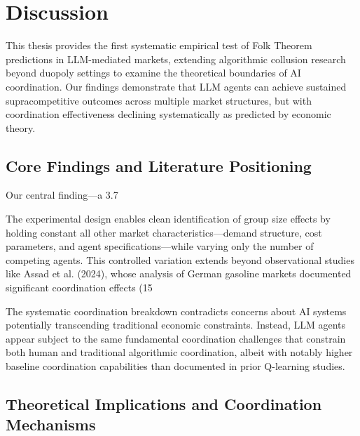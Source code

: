 \section{Discussion}\label{sec:dis}

This thesis provides the first systematic empirical test of Folk Theorem predictions in LLM-mediated markets, extending algorithmic collusion research beyond duopoly settings to examine the theoretical boundaries of AI coordination. Our findings demonstrate that LLM agents can achieve sustained supracompetitive outcomes across multiple market structures, but with coordination effectiveness declining systematically as predicted by economic theory.

\subsection{Core Findings and Literature Positioning}

Our central finding—a 3.7%

The experimental design enables clean identification of group size effects by holding constant all other market characteristics—demand structure, cost parameters, and agent specifications—while varying only the number of competing agents. This controlled variation extends beyond observational studies like Assad et al. (2024), whose analysis of German gasoline markets documented significant coordination effects (15%

The systematic coordination breakdown contradicts concerns about AI systems potentially transcending traditional economic constraints. Instead, LLM agents appear subject to the same fundamental coordination challenges that constrain both human and traditional algorithmic coordination, albeit with notably higher baseline coordination capabilities than documented in prior Q-learning studies.

\subsection{Theoretical Implications and Coordination Mechanisms}


